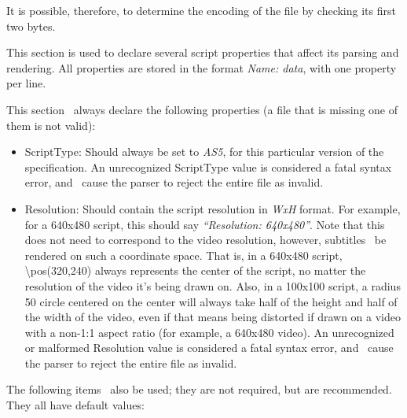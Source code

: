 \documentclass{spec}
\begin{document}
It is possible, therefore, to determine the encoding of the file by checking its first two bytes.

This section is used to declare several script properties that affect its parsing and rendering.
All properties are stored in the format \textit{Name: data}, with one property per line.

This section \must\ always declare the following properties (a file that is missing one of them is not valid):

\begin{itemize}
\item ScriptType: Should always be set to \textit{AS5}, for this particular version of the specification.
An unrecognized ScriptType value is considered a fatal syntax error, and \must\ cause the parser to
reject the entire file as invalid.
\item Resolution: Should contain the script resolution in \textit{WxH} format. For example, for a 640x480
script, this should say \textit{``Resolution: 640x480''}. Note that this does not need to correspond to the
video resolution, however, subtitles \must\ be rendered on such a coordinate space. That is, in a
640x480 script, \textbackslash{pos(320,240)} always represents the center of the script, no matter the
resolution of the video it's being drawn on. Also, in a 100x100 script, a radius 50 circle centered on
the center will always take half of the height and half of the width of the video, even if that means
being distorted if drawn on a video with a non-1:1 aspect ratio (for example, a 640x480 video).
An unrecognized or malformed Resolution value is considered a fatal syntax error, and \must\ cause the parser
to reject the entire file as invalid.
\end{itemize}

The following items \may\ also be used; they are not required, but are recommended. They all have default values:
\end{document}

